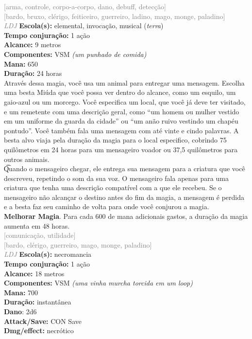 \documentclass{RPG_Adventure}[2021/10/20]
\begin{document}
{\scriptsize \textcolor{gray}{[arma, controle, corpo-a-corpo, dano, debuff, detecção]\\}}
{\scriptsize \textcolor{gray}{[bardo, bruxo, clérigo, feiticeiro, guerreiro, ladino, mago, monge, paladino]\\}}
{\tiny \textcolor{gray}{\textit{LDJ}}}
{\small \t \textbf{Escola(s):} elemental, invocação, musical (\textit{terra})\\\t \textbf{Tempo conjuração:} 1 ação\\\t \textbf{Alcance:} 9 metros\\\t \textbf{Componentes:} VSM \textit{(um punhado de comida)}\\\t \textbf{Mana:} 650\\\t \textbf{Duração:} 24 horas\\}
{\normalsize Através dessa magia, você usa um animal para entregar uma mensagem. Escolha uma besta Miúda que você possa ver dentro do alcance, como um esquilo, um gaio-azul ou um morcego. Você especifica um local, que você já deve ter visitado, e um remetente com uma descrição geral, como “um homem ou mulher vestido em um uniforme da guarda da cidade” ou “um anão ruivo vestindo um chapéu pontudo”. Você também fala uma mensagem com até vinte e cindo palavras. A besta alvo viaja pela duração da magia para o local especifico, cobrindo 75 quilômetros em 24 horas para um mensageiro voador ou 37,5 quilômetros para outros animais.\\\t Quando o mensageiro chegar, ele entrega sua mensagem para a criatura que você descreveu, repetindo o som da sua voz. O mensageiro fala apenas para uma criatura que tenha uma descrição compatível com a que ele recebeu. Se o mensageiro não alcançar o destino antes do fim da magia, a mensagem é perdida e a besta faz seu caminho de volta para onde você conjurou a magia.\\\t \textbf{Melhorar Magia}. Para cada 600 de mana adicionais gastos, a duração da magia aumenta em 48 horas.\\}
{\scriptsize \textcolor{gray}{[comunicação, utilidade]\\}}
{\scriptsize \textcolor{gray}{[bardo, clérigo, guerreiro, mago, monge, paladino]\\}}
{\tiny \textcolor{gray}{\textit{LDJ}}}
{\small \t \textbf{Escola(s):} necromancia\\\t \textbf{Tempo conjuração:} 1 ação\\\t \textbf{Alcance:} 18 metros\\\t \textbf{Componentes:} VSM \textit{(uma vinha murcha torcida em um loop)}\\\t \textbf{Mana:} 700\\\t \textbf{Duração:} instantânea\\\t \textbf{Dano}: 2d6\\\t \textbf{Attack/Save:} CON Save\\\t \textbf{Dmg/effect:} necrótico\\}
\end{document}
